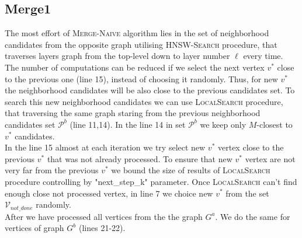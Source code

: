 \documentclass{article}
\begin{document}
\subsection{Merge1}
The most effort of \textsc{Merge-Naive} algorithm lies in the set of neighborhood candidates from the opposite graph utilising \textsc{HNSW-Search} procedure, that traverses layers graph from the top-level down to layer number $\ell$ every time. The number of computations can be reduced if we select the next vertex $v^*$ close to the previous one (line 15), instead of choosing it randomly. Thus, for new $v^*$ the neighborhood candidates will be  also close to the previous candidates set. To search this new neighborhood candidates we can use \textsc{LocalSearch} procedure, that traversing the same graph staring from the previous neighborhood candidates set $\mathcal{P}^b$ (line 11,14). In the line 14 in set $\mathcal{P}^b$ we keep only $M$-closest to $v^*$ candidates.\\
In the line 15 almost at each iteration we try select new $v^*$ vertex close to the previous  $v^*$ that was not already processed.  
To ensure that new $v^*$ vertex are not very far from the previous $v^*$ we bound the size of results of \textsc{LocalSearch} procedure controlling by "next\_step\_k" parameter. Once \textsc{LocalSearch} can't find enough close not processed vertex, in line 7 we choice new $v^*$ from the set $\mathcal{V}_{not\_done}$ randomly. \\
After we have processed all vertices from the the graph $G^a$. We do the same for vertices of graph $G^b$ (lines 21-22).  
\end{document}
